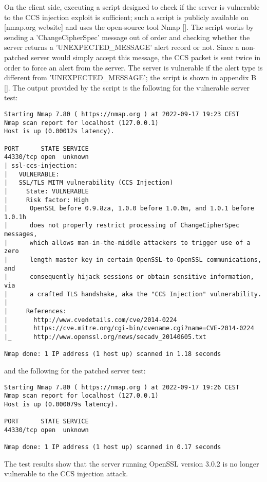 On the client side, executing a script designed to check if the server is vulnerable to the CCS injection exploit is sufficient; such a script is publicly available on [nmap.org website] and uses the open-source tool Nmap []. The script works by sending a 'ChangeCipherSpec' message out of order and checking whether the server returns a 'UNEXPECTED\_MESSAGE' alert record or not. Since a non-patched server would simply accept this message, the CCS packet is sent twice in order to force an alert from the server. The server is vulnerable if the alert type is different from 'UNEXPECTED\_MESSAGE'; the script is shown in appendix B []. The output provided by the script is the following for the vulnerable server test:  

\begin{verbatim}
Starting Nmap 7.80 ( https://nmap.org ) at 2022-09-17 19:23 CEST
Nmap scan report for localhost (127.0.0.1)
Host is up (0.00012s latency).

PORT      STATE SERVICE
44330/tcp open  unknown
| ssl-ccs-injection: 
|   VULNERABLE:
|   SSL/TLS MITM vulnerability (CCS Injection)
|     State: VULNERABLE
|     Risk factor: High
|      OpenSSL before 0.9.8za, 1.0.0 before 1.0.0m, and 1.0.1 before 1.0.1h
|      does not properly restrict processing of ChangeCipherSpec messages,
|      which allows man-in-the-middle attackers to trigger use of a zero
|      length master key in certain OpenSSL-to-OpenSSL communications, and
|      consequently hijack sessions or obtain sensitive information, via
|      a crafted TLS handshake, aka the "CCS Injection" vulnerability.
|           
|     References:
|       http://www.cvedetails.com/cve/2014-0224
|       https://cve.mitre.org/cgi-bin/cvename.cgi?name=CVE-2014-0224
|_      http://www.openssl.org/news/secadv_20140605.txt

Nmap done: 1 IP address (1 host up) scanned in 1.18 seconds
\end{verbatim}

and the following for the patched server test:
\begin{verbatim}
Starting Nmap 7.80 ( https://nmap.org ) at 2022-09-17 19:26 CEST
Nmap scan report for localhost (127.0.0.1)
Host is up (0.000079s latency).

PORT      STATE SERVICE
44330/tcp open  unknown

Nmap done: 1 IP address (1 host up) scanned in 0.17 seconds
\end{verbatim}

The test results show that the server running OpenSSL version 3.0.2 is no longer vulnerable to the CCS injection attack.


